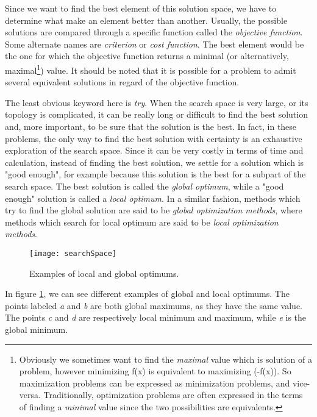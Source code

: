 Since we want to find the best element of this solution space, we have to determine what make an element better than another. Usually, the possible solutions are compared through a specific function called the \emph{objective function}. Some alternate names are \emph{criterion} or \emph{cost function}. The best element would be the one for which the objective function returns a minimal (or alternatively, maximal\footnote{Obviously we sometimes want to find the \emph{maximal} value which is solution of a problem, however minimizing f(x) is equivalent to maximizing (-f(x)). So maximization problems can be expressed as minimization problems, and vice-versa. Traditionally, optimization problems are often expressed in the terms of finding a \emph{minimal} value since the two possibilities are equivalents.}) value. It should be noted that it is possible for a problem to admit several equivalent solutions in regard of the objective function.


The least obvious keyword here is \emph{try}. When the search space is very large, or its topology is complicated, it can be really long or difficult to find the best solution and, more important, to be sure that the solution is the best. In fact, in these problems, the only way to find the best solution with certainty is an exhaustive exploration of the search space. Since it can be very costly in terms
of time and calculation, instead of finding the best solution, we settle for a solution which is "good enough", for example because this solution is the best for a subpart of the search space. The best solution is called the \emph{global optimum}, while a "good enough" solution is called a \emph{local optimum}. In a similar fashion, methods which try to find the global solution are said to be \emph{global optimization methods}, where methods which search for local optimum are said to be \emph{local optimization methods}.


\begin{figure}
\centering
\texttt{[image: searchSpace]}
\caption{Examples of local and global optimums.}
\label{localAndGlobalOptims}
\end{figure}

In figure \ref{localAndGlobalOptims}, we can see different examples of global and local optimums. The points labeled \emph{a} and \emph{b} are both global maximums, as they have the same value. The points
\emph{c} and \emph{d} are respectively local minimum and maximum, while \emph{e} is the global minimum.

